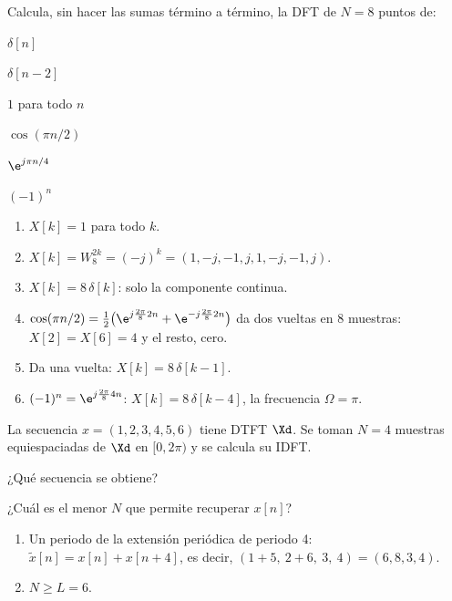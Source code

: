 \documentclass[11pt,a4paper]{scrartcl}
\begin{document}
\begin{ejercicio}
  Calcula, sin hacer las sumas término a término, la DFT de $N=8$ puntos de:
  \begin{incisos}[3]
    \item $\delta[n]$
    \item $\delta[n-2]$
    \item $1$ para todo $n$
    \item $\cos(\pi n/2)$
    \item $\e^{j\pi n/4}$
    \item $(-1)^n$
  \end{incisos}
\end{ejercicio}
\begin{solucion}
  \begin{enumerate}[label=\alph*)]
    \item $X[k]=1$ para todo $k$.
    \item $X[k]=W_8^{2k}=(-j)^k=(1,-j,-1,j,1,-j,-1,j)$.
    \item $X[k]=8\,\delta[k]$: solo la componente continua.
    \item $\cos(\pi n/2)=\frac12\big(\e^{j\frac{2\pi}{8}2n}+\e^{-j\frac{2\pi}{8}2n}\big)$ da dos vueltas en 8 muestras: $X[2]=X[6]=4$ y el resto, cero.
    \item Da una vuelta: $X[k]=8\,\delta[k-1]$.
    \item $(-1)^n=\e^{j\frac{2\pi}{8}4n}$: $X[k]=8\,\delta[k-4]$, la frecuencia $\Omega=\pi$.
  \end{enumerate}
\end{solucion}

\begin{ejercicio}
  La secuencia $x=(1,2,3,4,5,6)$ tiene DTFT $\Xd$. Se toman $N=4$ muestras equiespaciadas de $\Xd$ en $[0,2\pi)$ y se calcula su IDFT.
  \begin{incisos}[1]
    \item ¿Qué secuencia se obtiene?
    \item ¿Cuál es el menor $N$ que permite recuperar $x[n]$?
  \end{incisos}
\end{ejercicio}
\begin{solucion}
  \begin{enumerate}[label=\alph*)]
    \item Un periodo de la extensión periódica de periodo 4: $\tilde x[n]=x[n]+x[n+4]$, es decir, $(1+5,\ 2+6,\ 3,\ 4)=(6,8,3,4)$.
    \item $N\ge L=6$.
  \end{enumerate}
\end{solucion}
\end{document}
